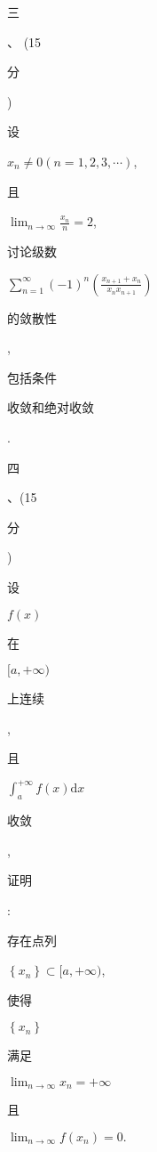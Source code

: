 \documentclass[10pt]{article}
\begin{document}
\begin{CJK}{UTF8}{mj}三\end{CJK}、 (15 \begin{CJK}{UTF8}{mj}分\end{CJK}) \begin{CJK}{UTF8}{mj}设\end{CJK} $x_{n} \neq 0(n=1,2,3, \cdots)$, \begin{CJK}{UTF8}{mj}且\end{CJK} $\lim _{n \rightarrow \infty} \frac{x_{n}}{n}=2$, \begin{CJK}{UTF8}{mj}讨论级数\end{CJK} $\sum_{n=1}^{\infty}(-1)^{n}\left(\frac{x_{n+1}+x_{n}}{x_{n} x_{n+1}}\right)$ \begin{CJK}{UTF8}{mj}的敛散性\end{CJK}, \begin{CJK}{UTF8}{mj}包括条件\end{CJK} \begin{CJK}{UTF8}{mj}收敛和绝对收敛\end{CJK}.

\begin{CJK}{UTF8}{mj}四\end{CJK}、(15 \begin{CJK}{UTF8}{mj}分\end{CJK}) \begin{CJK}{UTF8}{mj}设\end{CJK} $f(x)$ \begin{CJK}{UTF8}{mj}在\end{CJK} $[a,+\infty)$ \begin{CJK}{UTF8}{mj}上连续\end{CJK}, \begin{CJK}{UTF8}{mj}且\end{CJK} $\int_{a}^{+\infty} f(x) \mathrm{d} x$ \begin{CJK}{UTF8}{mj}收敛\end{CJK}, \begin{CJK}{UTF8}{mj}证明\end{CJK}: \begin{CJK}{UTF8}{mj}存在点列\end{CJK} $\left\{x_{n}\right\} \subset[a,+\infty)$, \begin{CJK}{UTF8}{mj}使得\end{CJK} $\left\{x_{n}\right\}$ \begin{CJK}{UTF8}{mj}满足\end{CJK} $\lim _{n \rightarrow \infty} x_{n}=+\infty$ \begin{CJK}{UTF8}{mj}且\end{CJK} $\lim _{n \rightarrow \infty} f\left(x_{n}\right)=0 .$
\end{document}
